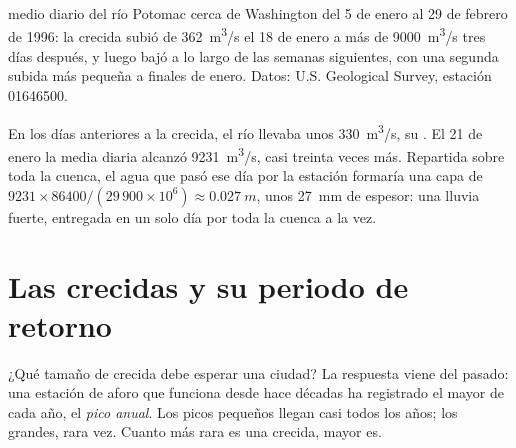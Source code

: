 \begin{omfigure}

{\small {} medio diario del río Potomac cerca de Washington del 5 de enero
al 29 de febrero de 1996: la crecida subió de \qty{362}{m^3/s} el 18 de enero
a más de \qty{9000}{m^3/s} tres días después, y luego bajó a lo largo de las
semanas siguientes, con una segunda subida más pequeña a finales de enero.
Datos: U.S. Geological Survey, estación 01646500.}
\end{omfigure}

En los días anteriores a la crecida, el río llevaba unos \qty{330}{m^3/s}, su
. El 21 de enero la media diaria alcanzó \qty{9231}{m^3/s}, casi
treinta veces más. Repartida sobre toda la cuenca, el agua que pasó ese día
por la estación formaría una capa de
$9231 \times 86400 / (29\,900 \times 10^6) \approx \qty{0.027}{m}$, unos
\qty{27}{mm} de espesor: una lluvia fuerte, entregada en un solo día por toda
la cuenca a la vez.

\section{Las crecidas y su periodo de retorno}

¿Qué tamaño de crecida debe esperar una ciudad? La respuesta viene del
pasado: una estación de aforo que funciona desde hace décadas ha registrado
el mayor  de cada año, el \emph{pico anual}. Los picos pequeños llegan
casi todos los años; los grandes, rara vez. Cuanto más rara es una crecida,
mayor es.

